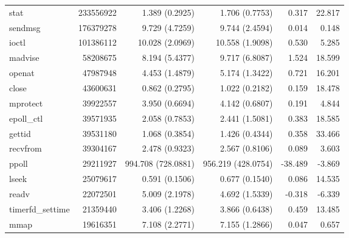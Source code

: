 \begin{longtable}{>{\ttfamily}lrrrrr}
                           stat &   233556922 &           1.389 (0.2925) &           1.706 (0.7753) &           0.317 &       22.817 \\
                        sendmsg &   176379278 &           9.729 (4.7259) &           9.744 (2.4594) &           0.014 &        0.148 \\
                          ioctl &   101386112 &          10.028 (2.0969) &          10.558 (1.9098) &           0.530 &        5.285 \\
                        madvise &    58208675 &           8.194 (5.4377) &           9.717 (6.8087) &           1.524 &       18.599 \\
                         openat &    47987948 &           4.453 (1.4879) &           5.174 (1.3422) &           0.721 &       16.201 \\
                          close &    43600631 &           0.862 (0.2795) &           1.022 (0.2182) &           0.159 &       18.478 \\
                       mprotect &    39922557 &           3.950 (0.6694) &           4.142 (0.6807) &           0.191 &        4.844 \\
                     epoll\_ctl &    39571935 &           2.058 (0.7853) &           2.441 (1.5081) &           0.383 &       18.585 \\
                         gettid &    39531180 &           1.068 (0.3854) &           1.426 (0.4344) &           0.358 &       33.466 \\
                       recvfrom &    39304167 &           2.478 (0.9323) &           2.567 (0.8106) &           0.089 &        3.603 \\
                          ppoll &    29211927 &       994.708 (728.0881) &       956.219 (428.0754) &         -38.489 &       -3.869 \\
                          lseek &    25079617 &           0.591 (0.1506) &           0.677 (0.1540) &           0.086 &       14.535 \\
                          readv &    22072501 &           5.009 (2.1978) &           4.692 (1.5339) &          -0.318 &       -6.339 \\
               timerfd\_settime &    21359440 &           3.406 (1.2268) &           3.866 (0.6438) &           0.459 &       13.485 \\
                           mmap &    19616351 &           7.108 (2.2771) &           7.155 (1.2866) &           0.047 &        0.657 \\

\end{longtable}
